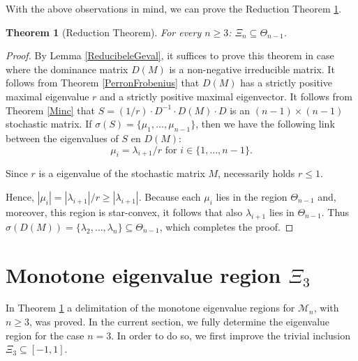 \documentclass[11pt,a4paper]{article}
\newtheorem{theorem}{Theorem}[section]
\theoremstyle{definition}
\theoremstyle{remark}
\begin{document}
With the above observations in mind, we can prove the Reduction Theorem \ref{ReductionTheorem}.

\begin{theorem}[Reduction Theorem] \label{ReductionTheorem}
    For every \(n \geqslant 3\): \(\Xi_{n} \subseteq \Theta_{n-1} \). 
\end{theorem}
\begin{proof}
By Lemma \ref{ReducibeleGeval}, it suffices to prove this theorem in case where the dominance matrix \(D(M)\) is a non-negative irreducible matrix. It follows from Theorem \ref{PerronFrobenius} that \(D(M)\) has a strictly positive maximal eigenvalue \(r\) and a strictly positive maximal eigenvector.  It follows from Theorem \ref{Minc} that \(S = (1/r) \cdot D^{-1} \cdot D(M) \cdot D \) is an \((n-1) \times (n-1)\) stochastic matrix. If \( \sigma(S) = \{\mu_1, \ldots, \mu_{n-1} \}\), then we have the following link between the eigenvalues of \(S\) en \(D(M)\):
        \[\mu_i = \lambda_{i+1}/r \text{ for } i \in \{1, \ldots, n-1\}.\]

Since \(r\) is a eigenvalue of the stochastic matrix \(M\), necessarily holds \(r \leq 1\).

Hence, \(|\mu_i| = |\lambda_{i+1}|/r \geqslant |\lambda_{i+1}| \). Because each \(\mu_i\) lies in the region \(\Theta_{n-1}\) and, moreover, this region is star-convex, it follows that also \(\lambda_{i+1}\) lies in \(\Theta_{n-1}\). Thus \( \sigma(D(M)) = \{\lambda_2, \ldots, \lambda_{n} \} \subseteq \Theta_{n-1} \), which completes the proof.
\end{proof}

\section{Monotone eigenvalue region \(\Xi_3\)}\label{Complete description}

In Theorem \ref{ReductionTheorem} a delimitation of the monotone eigenvalue regions for \(\mathcal{M}_n\), with \(n \geq 3 \), was proved. In the current section, we fully determine the eigenvalue region for the case \(n = 3\). In order to do so, we first improve the trivial inclusion \(\Xi_3 \subseteq [-1, 1]\).
\end{document}
